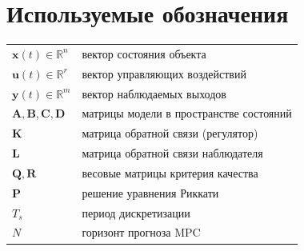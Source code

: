 \documentclass[12pt, a4paper, openany]{book}
\numberwithin{equation}{chapter}
\newcommand{\vect}[1]{\bm{#1}}
\newcommand{\mat}[1]{\mathbf{#1}}
\begin{document}
\section*{Используемые обозначения}

\begin{center}
\begin{tabular}{ll}
\toprule
$\vect{x}(t) \in \mathbb{R}^n$ & вектор состояния объекта\\
$\vect{u}(t) \in \mathbb{R}^r$ & вектор управляющих воздействий\\
$\vect{y}(t) \in \mathbb{R}^m$ & вектор наблюдаемых выходов\\
$\mat{A}, \mat{B}, \mat{C}, \mat{D}$ & матрицы модели в пространстве состояний\\
$\mat{K}$ & матрица обратной связи (регулятор)\\
$\mat{L}$ & матрица обратной связи наблюдателя\\
$\mat{Q}, \mat{R}$ & весовые матрицы критерия качества\\
$\mat{P}$ & решение уравнения Риккати\\
$T_s$ & период дискретизации\\
$N$ & горизонт прогноза MPC\\
\bottomrule
\end{tabular}
\end{center}





\end{document}
